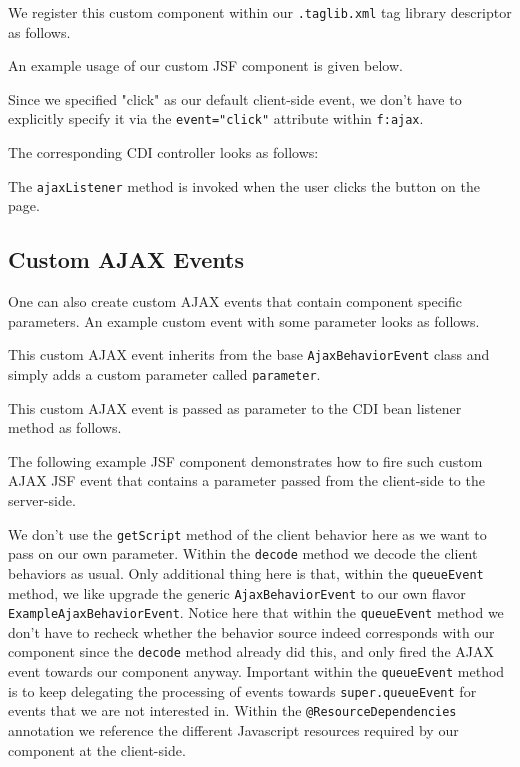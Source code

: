 We register this custom component within our \texttt{.taglib.xml} tag library descriptor as follows.


An example usage of our custom JSF component is given below.

Since we specified "click" as our default client-side event, we don't have to explicitly specify it via the \texttt{event="click"} attribute within \texttt{f:ajax}.

The corresponding CDI controller looks as follows:

The \texttt{ajaxListener} method is invoked when the user clicks the button on the page.

\subsection{Custom AJAX Events}

One can also create custom AJAX events that contain component specific parameters.
An example custom event with some parameter looks as follows.

This custom AJAX event inherits from the base \texttt{AjaxBehaviorEvent} class and simply adds a custom parameter called \texttt{parameter}.

This custom AJAX event is passed as parameter to the CDI bean listener method as follows.


The following example JSF component demonstrates how to fire such custom AJAX JSF event that contains a parameter passed from the client-side to the server-side.

We don't use the \texttt{getScript} method of the client behavior here as we want to pass on our own parameter.
Within the \texttt{decode} method we decode the client behaviors as usual.
Only additional thing here is that, within the \texttt{queueEvent} method, we like upgrade the generic \texttt{AjaxBehaviorEvent} to our own flavor \texttt{ExampleAjaxBehaviorEvent}.
Notice here that within the \texttt{queueEvent} method we don't have to recheck whether the behavior source indeed corresponds with our component since the \texttt{decode} method already did this, and only fired the AJAX event towards our component anyway.
Important within the \texttt{queueEvent} method is to keep delegating the processing of events towards \texttt{super.queueEvent} for events that we are not interested in.
Within the \texttt{@ResourceDependencies} annotation we reference the different Javascript resources required by our component at the client-side.

